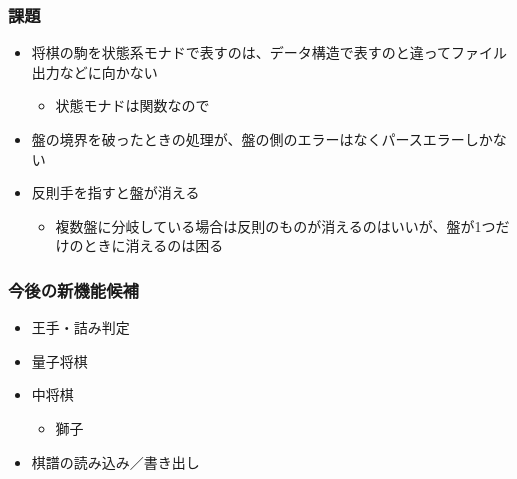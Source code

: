 \documentclass[xcolor=table]{beamer}
\begin{document}
\begin{mdframe}%

\frametitle{課題}\label{heading-section}%

\begin{itemize}[noitemsep,topsep=\mdcompacttopsep]%

\item{}将棋の駒を状態系モナドで表すのは、データ構造で表すのと違ってファイル出力などに向かない

\begin{itemize}[noitemsep,topsep=\mdcompacttopsep]%

\item{}状態モナドは関数なので%
\end{itemize}%

\item{}盤の境界を破ったときの処理が、盤の側のエラーはなくパースエラーしかない%

\item{}反則手を指すと盤が消える

\begin{itemize}[noitemsep,topsep=\mdcompacttopsep]%

\item{}複数盤に分岐している場合は反則のものが消えるのはいいが、盤が1つだけのときに消えるのは困る%
\end{itemize}%
\end{itemize}%
\end{mdframe}\label{section}%

\begin{mdframe}%

\frametitle{今後の新機能候補}\label{heading-section}%

\begin{itemize}[noitemsep,topsep=\mdcompacttopsep]%

\item{}王手・詰み判定%

\item{}量子将棋%

\item{}中将棋

\begin{itemize}[noitemsep,topsep=\mdcompacttopsep]%

\item{}獅子%
\end{itemize}%

\item{}棋譜の読み込み／書き出し%
\end{itemize}%
\end{mdframe}\label{section}%
\end{document}
